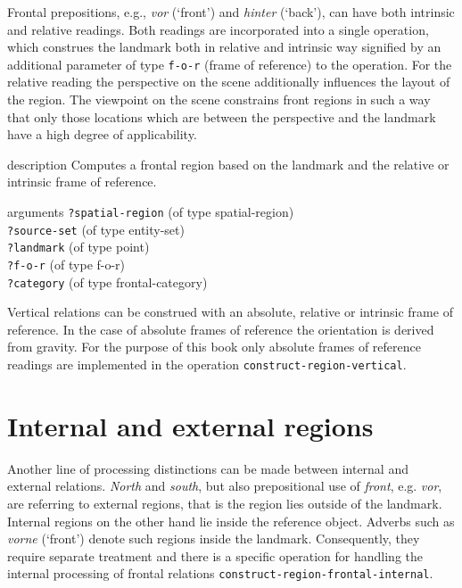 Frontal prepositions, e.g., \textit{vor} (`front') and \textit{hinter} (`back'), can have
both intrinsic and relative readings. Both readings are incorporated
into a single operation, which construes the landmark both
in relative and intrinsic way signified by an additional parameter
of type {\footnotesize\tt f-o-r} (frame of reference) to the operation.
For the relative reading the perspective on the scene additionally
influences the layout of the region. The viewpoint on
the scene constrains front regions in such a way that
only those locations which are between the perspective and
the landmark have a high degree of applicability.

\begin{explanation}{description}
Computes a frontal region based on the landmark
and the relative or intrinsic frame of reference.
\end{explanation}
\begin{explanation}{arguments}
{\footnotesize\verb+?spatial-region+} (of type spatial-region) \\
{\footnotesize\verb+?source-set+} (of type entity-set) \\
{\footnotesize\verb+?landmark+} (of type point)\\
{\footnotesize\verb+?f-o-r+} (of type f-o-r)\\
{\footnotesize\verb+?category+} (of type frontal-category)
\vspace{0.3cm}
\end{explanation}

Vertical relations can be construed with an absolute, relative\enlargethispage{1\baselineskip}
or intrinsic frame of reference. In the case of absolute frames
of reference the orientation is derived from gravity. For the purpose
of this book only absolute frames of reference readings are
implemented in the operation {\footnotesize\tt construct-region-vertical}.


\section{Internal and external regions}
Another line of processing distinctions can be made between internal 
and external relations. \textit{North} and \textit{south}, but also prepositional use
of \textit{front}, e.g. \textit{vor}, are referring to external regions, that is the
region lies outside of the landmark. Internal regions on the other
hand lie inside the reference object. Adverbs such as \textit{vorne} (`front')
denote such regions inside the landmark. Consequently, they require
separate treatment and there is a specific operation
for handling the internal processing of frontal relations 
{\footnotesize\tt construct-region-frontal-internal}.

